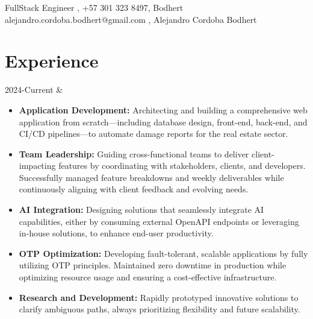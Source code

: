 \documentclass[
    changecolor={111, 156, 45}, 
]{cv-roald}
\begin{document}
\pagestyle{empty} %

 {%
  \FAspace FullStack Engineer \sep
  \faMobile \FAspace +57 301 323 8497\sep%
  \faGithub \FAspace Bodhert \FAspace {}
 }
 {%
  \faEnvelope \FAspace alejandro.cordoba.bodhert@gmail.com \sep%
  \faLinkedinSquare  \FAspace Alejandro Cordoba Bodhert \FAspace {}
 }


\section*{Experience}

2024-Current & 
\begin{itemize}
  \item \textbf{Application Development:} Architecting and building a comprehensive web application from scratch—including database design, front-end, back-end, and CI/CD pipelines—to automate damage reports for the real estate sector.
  
  \item \textbf{Team Leadership:} Guiding cross-functional teams to deliver client-impacting features by coordinating with stakeholders, clients, and developers. Successfully managed feature breakdowns and weekly deliverables while continuously aligning with client feedback and evolving needs.
  
  \item \textbf{AI Integration:} Designing solutions that seamlessly integrate AI capabilities, either by consuming external OpenAPI endpoints or leveraging in-house solutions, to enhance end-user productivity.
  
  \item \textbf{OTP Optimization:} Developing fault-tolerant, scalable applications by fully utilizing OTP principles. Maintained zero downtime in production while optimizing resource usage and ensuring a cost-effective infrastructure.
  
  \item \textbf{Research and Development:} Rapidly prototyped innovative solutions to clarify ambiguous paths, always prioritizing flexibility and future scalability.
\end{itemize}
\end{document}
